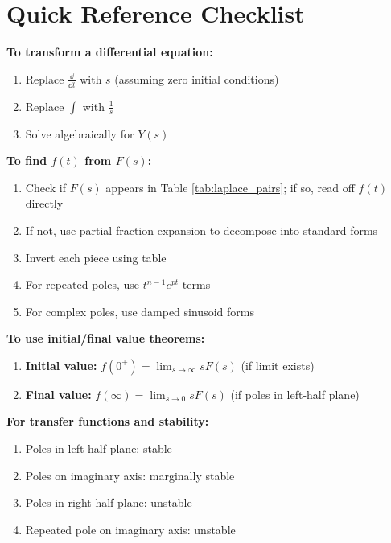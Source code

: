 \section{Quick Reference Checklist}
\label{sec:quick_reference}

\begin{keyconceptbox}[title=When Working with Laplace Transforms]

\textbf{To transform a differential equation:}
\begin{enumerate}
    \item Replace $\frac{\dd}{\dd t}$ with $s$ (assuming zero initial conditions)
    \item Replace $\int$ with $\frac{1}{s}$
    \item Solve algebraically for $Y(s)$
\end{enumerate}

\textbf{To find $f(t)$ from $F(s)$:}
\begin{enumerate}
    \item Check if $F(s)$ appears in Table \ref{tab:laplace_pairs}; if so, read off $f(t)$ directly
    \item If not, use partial fraction expansion to decompose into standard forms
    \item Invert each piece using table
    \item For repeated poles, use $t^{n-1}e^{pt}$ terms
    \item For complex poles, use damped sinusoid forms
\end{enumerate}

\textbf{To use initial/final value theorems:}
\begin{enumerate}
    \item \textbf{Initial value:} $f(0^+) = \lim_{s \to \infty} s F(s)$ (if limit exists)
    \item \textbf{Final value:} $f(\infty) = \lim_{s \to 0} s F(s)$ (if poles in left-half plane)
\end{enumerate}

\textbf{For transfer functions and stability:}
\begin{enumerate}
    \item Poles in left-half plane: stable
    \item Poles on imaginary axis: marginally stable
    \item Poles in right-half plane: unstable
    \item Repeated pole on imaginary axis: unstable
\end{enumerate}

\end{keyconceptbox}

